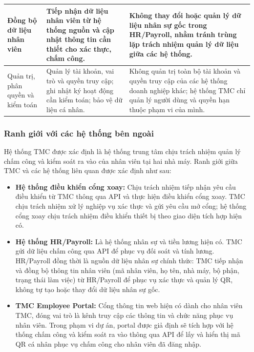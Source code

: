 \begin{longtable}{|>{\raggedright\arraybackslash}m{2.8cm}|>{\raggedright\arraybackslash}m{6.1cm}|>{\raggedright\arraybackslash}m{6.3cm}|}
    \hline
    Đồng bộ dữ liệu nhân viên & Tiếp nhận dữ liệu nhân viên từ hệ thống nguồn và cập nhật thông tin cần thiết cho xác thực, chấm công. & Không thay đổi hoặc quản lý dữ liệu nhân sự gốc trong HR/Payroll, nhằm tránh trùng lặp trách nhiệm quản lý dữ liệu giữa các hệ thống.\\
    \hline
    Quản trị, phân quyền và kiểm toán & Quản lý tài khoản, vai trò và quyền truy cập; ghi nhật ký hoạt động cần kiểm toán; bảo vệ dữ liệu cá nhân. & Không quản trị toàn bộ tài khoản và quyền truy cập của các hệ thống doanh nghiệp khác; hệ thống TMC chỉ quản lý người dùng và quyền hạn thuộc phạm vi của mình.\\
    \hline
\end{longtable}
\endgroup

\subsubsection{Ranh giới với các hệ thống bên ngoài}\label{sec:external-boundaries}

Hệ thống TMC được xác định là hệ thống trung tâm chịu trách nhiệm quản lý chấm công và kiểm soát ra vào của nhân viên tại hai nhà máy. Ranh giới giữa TMC và các hệ thống liên quan được xác định như sau:

\begin{itemize}
    \item \textbf{Hệ thống điều khiển cổng xoay:} Chịu trách nhiệm tiếp nhận yêu cầu điều khiển từ TMC thông qua API và thực hiện điều khiển cổng xoay. TMC chịu trách nhiệm xử lý nghiệp vụ xác thực và gửi yêu cầu mở cổng; hệ thống cổng xoay chịu trách nhiệm điều khiển thiết bị theo giao diện tích hợp hiện có.
    \item \textbf{Hệ thống HR/Payroll:} Là hệ thống nhân sự và tiền lương hiện có. TMC gửi dữ liệu chấm công qua API để phục vụ đối soát và tính lương. HR/Payroll đồng thời là nguồn dữ liệu nhân sự chính thức: TMC tiếp nhận và đồng bộ thông tin nhân viên (mã nhân viên, họ tên, nhà máy, bộ phận, trạng thái làm việc) từ HR/Payroll để phục vụ xác thực và quản lý QR, không tự tạo hoặc thay đổi dữ liệu nhân sự gốc.
    \item \textbf{TMC Employee Portal:} Cổng thông tin web hiện có dành cho nhân viên TMC, đóng vai trò là kênh truy cập các thông tin và chức năng phục vụ nhân viên. Trong phạm vi dự án, portal được giả định sẽ tích hợp với hệ thống chấm công và kiểm soát ra vào thông qua API để lấy và hiển thị mã QR cá nhân phục vụ chấm công cho nhân viên đã đăng nhập.
\end{itemize}

